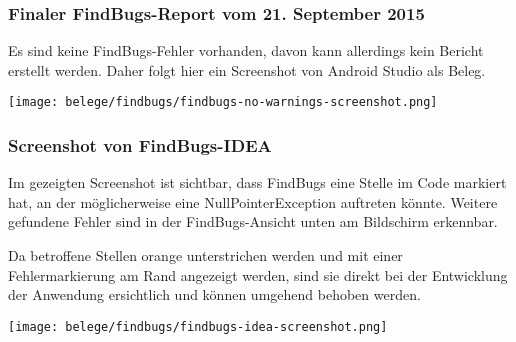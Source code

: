 \subsubsection{Finaler FindBugs-Report vom 21. September 2015}


Es sind keine FindBugs-Fehler vorhanden, davon kann allerdings kein Bericht erstellt werden. Daher folgt hier ein Screenshot von Android Studio als Beleg.

\texttt{[image: belege/findbugs/findbugs-no-warnings-screenshot.png]}


\clearpage
\subsubsection{Screenshot von FindBugs-IDEA}

Im gezeigten Screenshot ist sichtbar, dass FindBugs eine Stelle im Code markiert hat, an der möglicherweise eine NullPointerException auftreten könnte. Weitere gefundene Fehler sind in der FindBugs-Ansicht unten am Bildschirm erkennbar.

Da betroffene Stellen orange unterstrichen werden und mit einer Fehlermarkierung am Rand angezeigt werden, sind sie direkt bei der Entwicklung der Anwendung ersichtlich und können umgehend behoben werden.

\texttt{[image: belege/findbugs/findbugs-idea-screenshot.png]}

